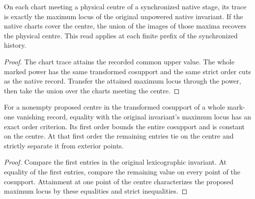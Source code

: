 \begin{theorem}
\label{hir:g8-physical-centre-original-native-maxima}
\leanok
On each chart meeting a physical centre of a synchronized
native stage, its trace is exactly the maximum locus of the
original unpowered native invariant. If the native charts
cover the centre, the union of the images of those maxima
recovers the physical centre. This read applies at each
finite prefix of the synchronized history.
\end{theorem}
\begin{proof}
The chart trace attains the recorded common upper value.
The whole marked power has the same transformed cosupport
and the same strict order cuts as the native record.
Transfer the attained maximum locus through the power,
then take the union over the charts meeting the centre.
\end{proof}

\begin{theorem}
\label{hir:g8-whole-mark-one-centre-order-test}
\leanok
For a nonempty proposed centre in the transformed cosupport
of a whole mark-one vanishing record, equality with the
original invariant's maximum locus has an exact order
criterion. Its first order bounds the entire cosupport and
is constant on the centre. At that first order the remaining
entries tie on the centre and strictly separate it from
exterior points.
\end{theorem}
\begin{proof}
Compare the first entries in the original lexicographic
invariant. At equality of the first entries, compare the
remaining value on every point of the cosupport. Attainment
at one point of the centre characterizes the proposed
maximum locus by these equalities and strict inequalities.
\end{proof}

